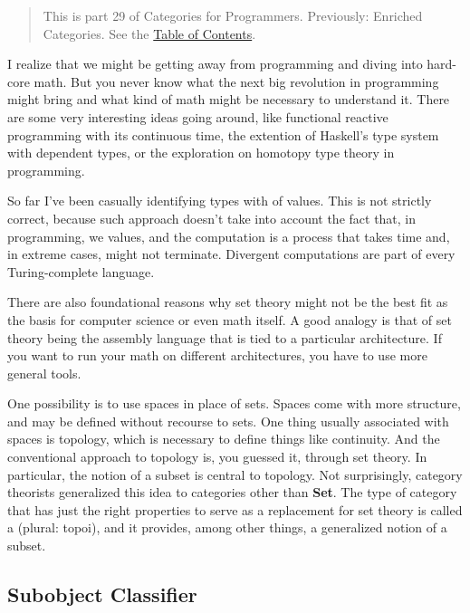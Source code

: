 \begin{quote}
This is part 29 of Categories for Programmers. Previously: {Enriched
Categories}. See the
\href{https://bartoszmilewski.com/2014/10/28/category-theory-for-programmers-the-preface/}{Table
of Contents}.
\end{quote}

I realize that we might be getting away from programming and diving into
hard-core math. But you never know what the next big revolution in
programming might bring and what kind of math might be necessary to
understand it. There are some very interesting ideas going around, like
functional reactive programming with its continuous time, the extention
of Haskell's type system with dependent types, or the exploration on
homotopy type theory in programming.

So far I've been casually identifying types with  of values.
This is not strictly correct, because such approach doesn't take into
account the fact that, in programming, we  values, and the
computation is a process that takes time and, in extreme cases, might
not terminate. Divergent computations are part of every Turing-complete
language.

There are also foundational reasons why set theory might not be the best
fit as the basis for computer science or even math itself. A good
analogy is that of set theory being the assembly language that is tied
to a particular architecture. If you want to run your math on different
architectures, you have to use more general tools.

One possibility is to use spaces in place of sets. Spaces come with more
structure, and may be defined without recourse to sets. One thing
usually associated with spaces is topology, which is necessary to define
things like continuity. And the conventional approach to topology is,
you guessed it, through set theory. In particular, the notion of a
subset is central to topology. Not surprisingly, category theorists
generalized this idea to categories other than \textbf{Set}. The type of
category that has just the right properties to serve as a replacement
for set theory is called a  (plural: topoi), and it
provides, among other things, a generalized notion of a subset.

\subsection{Subobject Classifier}\label{subobject-classifier}

